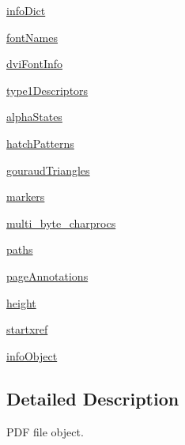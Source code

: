 \begin{DoxyCompactItemize}
\hyperlink{classmatplotlib_1_1backends_1_1backend__pdf_1_1PdfFile_a7929312f5240deaca419a476383009c5}{info\+Dict}
\item 
\hyperlink{classmatplotlib_1_1backends_1_1backend__pdf_1_1PdfFile_a65d64a2e7eb592853bfd993a8403f18c}{font\+Names}
\item 
\hyperlink{classmatplotlib_1_1backends_1_1backend__pdf_1_1PdfFile_ae5af7eb04841ba72b3b17bdbabecad5f}{dvi\+Font\+Info}
\item 
\hyperlink{classmatplotlib_1_1backends_1_1backend__pdf_1_1PdfFile_ab8132aeef26d765a5c1b4eeda06fb56d}{type1\+Descriptors}
\item 
\hyperlink{classmatplotlib_1_1backends_1_1backend__pdf_1_1PdfFile_aac2e0646a99c1404b0460b2a27d11955}{alpha\+States}
\item 
\hyperlink{classmatplotlib_1_1backends_1_1backend__pdf_1_1PdfFile_a2b5be9919b2301dfdde3e5bbd86d887b}{hatch\+Patterns}
\item 
\hyperlink{classmatplotlib_1_1backends_1_1backend__pdf_1_1PdfFile_abdc3ee295284e928be04ea13941544bf}{gouraud\+Triangles}
\item 
\hyperlink{classmatplotlib_1_1backends_1_1backend__pdf_1_1PdfFile_aa46bb65a6bc91a807a311e9eeb4fcc65}{markers}
\item 
\hyperlink{classmatplotlib_1_1backends_1_1backend__pdf_1_1PdfFile_aca90dcc0462cd03477c7442b3a50d4bb}{multi\+\_\+byte\+\_\+charprocs}
\item 
\hyperlink{classmatplotlib_1_1backends_1_1backend__pdf_1_1PdfFile_aa9708ad74a0b1f576f0c61aeb63dfa30}{paths}
\item 
\hyperlink{classmatplotlib_1_1backends_1_1backend__pdf_1_1PdfFile_a3599d6db0db5d67f3bf80738febe1266}{page\+Annotations}
\item 
\hyperlink{classmatplotlib_1_1backends_1_1backend__pdf_1_1PdfFile_a470c2997c5b485ac4da9f54faddc79c8}{height}
\item 
\hyperlink{classmatplotlib_1_1backends_1_1backend__pdf_1_1PdfFile_a764671b39d516482edfc2eff7a36b0ab}{startxref}
\item 
\hyperlink{classmatplotlib_1_1backends_1_1backend__pdf_1_1PdfFile_a704438b971ff7dff6bd3e5e9ba37652b}{info\+Object}
\end{DoxyCompactItemize}


\subsection{Detailed Description}
\begin{DoxyVerb}PDF file object.\end{DoxyVerb}
 

